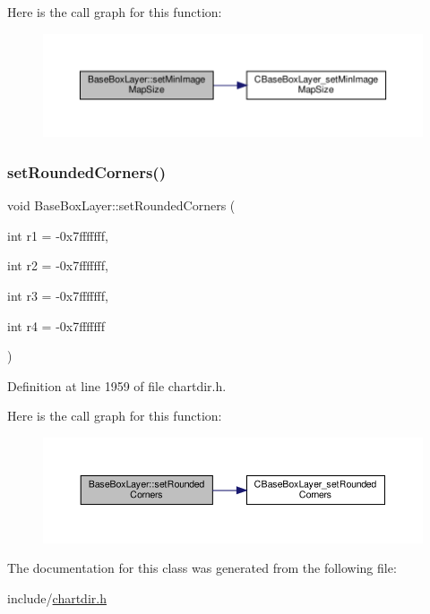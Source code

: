 Here is the call graph for this function\+:
\nopagebreak
\begin{figure}[H]
\begin{center}
\leavevmode
\includegraphics[width=350pt]{class_base_box_layer_af812d2d5a07c3e21c928aca3245b2ad9_cgraph}
\end{center}
\end{figure}
\mbox{\label{class_base_box_layer_a5ae92b6660c23c10cbaaaeb2c1129db9}} 
\subsubsection{\texorpdfstring{set\+Rounded\+Corners()}{setRoundedCorners()}}
{\footnotesize\ttfamily void Base\+Box\+Layer\+::set\+Rounded\+Corners (\begin{DoxyParamCaption}\item[{int}]{r1 = {\ttfamily -\/0x7fffffff},  }\item[{int}]{r2 = {\ttfamily -\/0x7fffffff},  }\item[{int}]{r3 = {\ttfamily -\/0x7fffffff},  }\item[{int}]{r4 = {\ttfamily -\/0x7fffffff} }\end{DoxyParamCaption})\hspace{0.3cm}{\ttfamily [inline]}}



Definition at line 1959 of file chartdir.\+h.

Here is the call graph for this function\+:
\nopagebreak
\begin{figure}[H]
\begin{center}
\leavevmode
\includegraphics[width=350pt]{class_base_box_layer_a5ae92b6660c23c10cbaaaeb2c1129db9_cgraph}
\end{center}
\end{figure}


The documentation for this class was generated from the following file\+:\begin{DoxyCompactItemize}
\item 
include/\hyperlink{chartdir_8h}{chartdir.\+h}\end{DoxyCompactItemize}
